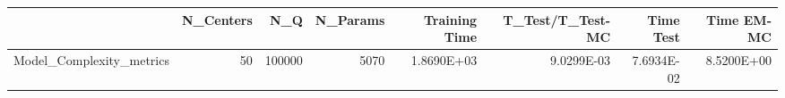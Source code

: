 \begin{tabular}{lrrrrrrr}
\toprule
{} &  N\_Centers &     N\_Q &  N\_Params &  Training Time &  T\_Test/T\_Test-MC &  Time Test &  Time EM-MC \\
\midrule
Model\_Complexity\_metrics &         50 &  100000 &      5070 &     1.8690E+03 &        9.0299E-03 & 7.6934E-02 &  8.5200E+00 \\
\bottomrule
\end{tabular}
